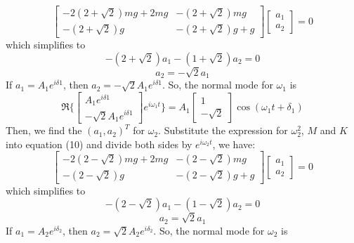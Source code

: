 \documentclass[11pt]{article}
\begin{document}
\begin{equation*}
  \begin{bmatrix}
    -2(2+\sqrt{2})mg +2mg & -(2+\sqrt{2})mg \\
    -(2+\sqrt{2})g & -(2+\sqrt{2})g + g
  \end{bmatrix}
  \begin{bmatrix}
    a_1 \\
    a_2
  \end{bmatrix}
  = 0
\end{equation*}
which simplifies to
\begin{equation*}
  -(2+\sqrt{2})a_1 -(1+\sqrt{2})a_2 = 0
\end{equation*}
\begin{equation*}
  a_2 = -\sqrt{2} a_1
\end{equation*}
If \(a_1 = A_1e^{i\delta 1}\), then \(a_2 = -\sqrt{2}A_1e^{i\delta 1}\). So, the normal mode for \(\omega_1\) is
\begin{equation}
  \Re\{
  \begin{bmatrix}
    A_1e^{i\delta 1}\\
    -\sqrt{2}A_1 e^{i\delta 1}
  \end{bmatrix}
  e^{i\omega_1 t} \}
  =A_1
  \begin{bmatrix}
    1 \\
    -\sqrt{2}
  \end{bmatrix}
  \cos(\omega_1 t +\delta_1)
\end{equation}
Then, we find the \((a_1, a_2)^T\) for \(\omega_2\). Substitute the expression for \(\omega_2^2\), \(M\) and \(K\)
into equation (10) and divide both sides by \(e^{i\omega_2 t}\), we have:
\begin{equation*}
  \begin{bmatrix}
    -2(2-\sqrt{2})mg +2mg & -(2-\sqrt{2})mg \\
    -(2-\sqrt{2})g & -(2-\sqrt{2})g + g
  \end{bmatrix}
  \begin{bmatrix}
    a_1 \\
    a_2
  \end{bmatrix}
  = 0
\end{equation*}
which simplifies to
\begin{equation*}
  -(2-\sqrt{2})a_1 -(1-\sqrt{2})a_2 = 0
\end{equation*}
\begin{equation*}
  a_2 = \sqrt{2} a_1
\end{equation*}
If \(a_1 = A_2e^{i\delta_2}\), then \(a_2 = \sqrt{2}A_2e^{i\delta_2}\). So, the normal mode for \(\omega_2\) is
\end{document}
